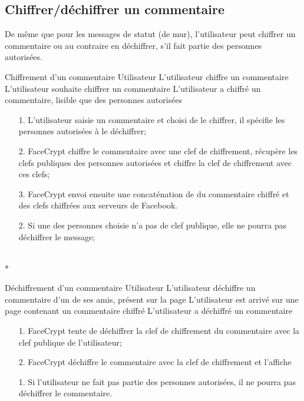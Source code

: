 \documentclass[a4paper,11pt,french]{article}
\begin{document}
\subsection{Chiffrer/déchiffrer un commentaire}
De même que pour les messages de statut (de mur), l'utilisateur
peut chiffrer un commentaire ou au contraire en déchiffrer,
s'il fait partie des personnes autorisées.

\fiche
	{Chiffrement d'un commentaire}
	{Utilisateur}
	{L'utilisateur chiffre un commentaire}
	{}
	{L'utilisateur souhaite chiffrer un commentaire}
	{L'utilisateur a chiffré un commentaire, lisible que des personnes 
        autorisées}
	{\begin{itemize}
	    \item[]
	  \item[1.] L'utilisateur saisie un commentaire et choisi de le chiffrer,
          il spécifie les personnes autorisées à le déchiffrer;
	\end{itemize}
	}
	{\begin{itemize}
        \item[]
		\item[2.] FaceCrypt chiffre le commentaire avec une clef 
        de chiffrement, récupère les clefs publiques
        des personnes autorisées et chiffre la clef de chiffrement
        avec ces clefs;
		\item[3.] FaceCrypt envoi ensuite une concaténation de 
        du commentaire chiffré et des clefs chiffrées aux serveurs de Facebook.
	\end{itemize}
	}
	{}
\flots
    {\begin{itemize}
    \item[]
    \item[2.] Si une des personnes choisie n'a pas de clef publique,
        elle ne pourra pas déchiffrer le message;
    \end{itemize}
    }
	{}    
\\*

\fiche
	{Déchiffrement d'un commentaire}
	{Utilisateur}
	{L'utilisateur déchiffre un commentaire d'un de ses amis, présent sur la
        page}
	{}
	{L'utilisateur est arrivé sur une page contenant un commentaire chiffré}
	{L'utilisateur a déchiffré un commentaire}
    {}
	{\begin{itemize}
        \item[]
		\item[1.] FaceCrypt tente de déchiffrer la clef de chiffrement
            du commentaire avec la clef publique de l'utilisateur;
		\item[2.] FaceCrypt déchiffre le commentaire avec la clef
            de chiffrement et l'affiche
	\end{itemize}
	}
	{}
\flots
    {}
    {\begin{itemize}
    \item[]
    \item[1.] Si l'utilisateur ne fait pas partie des personnes
        autorisées, il ne pourra pas déchiffrer le commentaire.
    \end{itemize}
    }
	{}    
\end{document}
